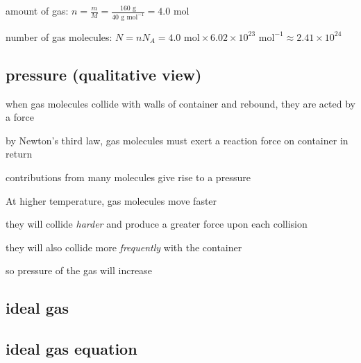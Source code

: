 
\begin{soln} amount of gas: $n=\frac{m}{M} = \frac{160 \text{ g}}{40 \text{ g mol}^{-1}} = 4.0 \text{ mol}$

number of gas molecules: $N = n N_A = 4.0 \text{ mol} \times 6.02\times10^{23} \text{ mol}^{-1} \approx 2.41 \times 10^{24}$ \end{soln}

	




\subsection{pressure (qualitative view)}

when gas molecules collide with walls of container and rebound, they are acted by a force

by Newton's third law, gas molecules must exert a reaction force on container in return

contributions from many molecules give rise to a pressure


\begin{soln}At higher temperature, gas molecules move faster

they will collide \emph{harder} and produce a greater force upon each collision

they will also collide more \emph{frequently} with the container

so pressure of the gas will increase \end{soln}





\subsection{ideal gas}

\subsection{ideal gas equation}

